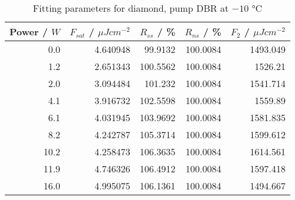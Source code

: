 \begin{table}[H]
\caption{Fitting parameters for diamond, pump DBR at $-10$ °C}
\begin{tabular}{rrrrr}
\toprule
Power / $W$ & $F_{sat}$ / $\mu Jcm^{-2}$ & $R_{ss}$ / \% & $R_{ns}$ / \% & $F_2$ / $\mu Jcm^{-2}$ \\
\midrule
0.0 & 4.640948 & 99.9132 & 100.0084 & 1493.049 \\
1.2 & 2.651343 & 100.5562 & 100.0084 & 1526.21 \\
2.0 & 3.094484 & 101.232 & 100.0084 & 1541.714 \\
4.1 & 3.916732 & 102.5598 & 100.0084 & 1559.89 \\
6.1 & 4.031945 & 103.9692 & 100.0084 & 1581.835 \\
8.2 & 4.242787 & 105.3714 & 100.0084 & 1599.612 \\
10.2 & 4.258473 & 106.3635 & 100.0084 & 1614.561 \\
11.9 & 4.746326 & 106.4912 & 100.0084 & 1597.418 \\
16.0 & 4.995075 & 106.1361 & 100.0084 & 1494.667 \\
\bottomrule
\end{tabular}
\end{table}
